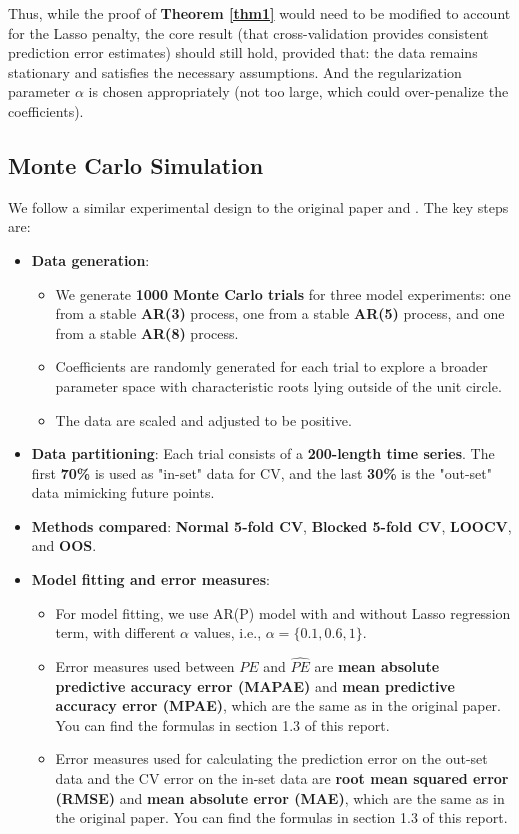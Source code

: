 \documentclass[12pt, oneside]{amsart}
\theoremstyle{definition}
\theoremstyle{remark}
\numberwithin{equation}{section}
\begin{document}
Thus, while the proof of \textbf{Theorem \ref{thm1}} would need to be modified to account for the Lasso penalty, the core result (that cross-validation provides consistent prediction error estimates) should still hold, provided that: the data remains stationary and satisfies the necessary assumptions. And the regularization parameter $\alpha$ is chosen appropriately (not too large, which could over-penalize the coefficients).

\subsection{Monte Carlo Simulation}
We follow a similar experimental design to the original paper and \citep{Bergmeir2014}. The key steps are:

\begin{itemize}
    \item \textbf{Data generation}:
    \begin{itemize}
        \item We generate \textbf{1000 Monte Carlo trials} for three model experiments: one from a stable \textbf{AR(3)} process, one from a stable \textbf{AR(5)} process, and one from a stable \textbf{AR(8)} process.
        \item Coefficients are randomly generated for each trial to explore a broader parameter space with characteristic roots lying outside of the unit circle. 
        \item The data are scaled and adjusted to be positive.
    \end{itemize}
    \item \textbf{Data partitioning}:
Each trial consists of a \textbf{200-length time series}. The first \textbf{70\%} is used as "in-set" data for CV, and the last \textbf{30\%} is the "out-set" data mimicking future points.

    \item \textbf{Methods compared}:
\textbf{Normal 5-fold CV}, \textbf{Blocked 5-fold CV}, \textbf{LOOCV}, and \textbf{OOS}.
    \item \textbf{Model fitting and error measures}:
    \begin{itemize}
        \item For model fitting, we use AR(P) model with and without Lasso regression term, with different $\alpha$ values, i.e., $\alpha = \{0.1, 0.6, 1\}$.
        \item Error measures used between $PE$ and $\hat{PE}$ are \textbf{mean absolute predictive accuracy error (MAPAE)} and 
        \textbf{mean predictive accuracy error (MPAE)}, which are the same as in the original paper. You can find the formulas in section 1.3 of this report. 
        \item Error measures used for calculating the prediction error on the out-set data and the CV error on the in-set data are \textbf{root mean squared error (RMSE)} and \textbf{mean absolute error (MAE)}, which are the same as in the original paper. You can find the formulas in section 1.3 of this report. 
    \end{itemize}

\end{itemize}
\end{document}
